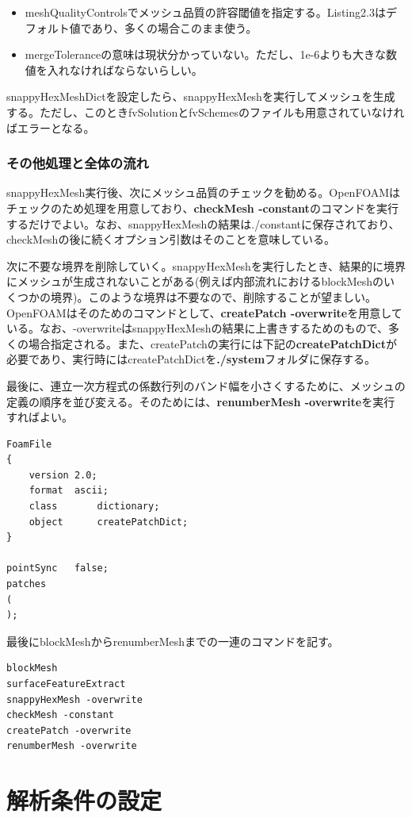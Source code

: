 \documentclass[dvipdfmx, 9pt, a4paper]{jsarticle}
\numberwithin{equation}{section}
\begin{document}
\begin{itemize}
\begin{itemize}
\item minThicknessで下限サイズを指定する。
\item layersのディクショナリでレイヤーメッシュを作成する境界面を指定する。本例のように境界名とレイヤー数(nSurfaceLayers)を指定する。なお、境界はジオメトリの名前と境界面の名前で名づける。Listing2.3はジオメトリgeo(つまりgeo.stl)に含まれる境界名side(solid sideで定義されている面)の例であり、\"geo\_side\"のようにアンダーバーでつなげる。
\end{itemize}
\item meshQualityControlsでメッシュ品質の許容閾値を指定する。Listing2.3はデフォルト値であり、多くの場合このまま使う。
\item mergeToleranceの意味は現状分かっていない。ただし、1e-6よりも大きな数値を入れなければならないらしい。
\end{itemize}\par
snappyHexMeshDictを設定したら、snappyHexMeshを実行してメッシュを生成する。ただし、このときfvSolutionとfvSchemesのファイルも用意されていなければエラーとなる。

\subsubsection{その他処理と全体の流れ}
snappyHexMesh実行後、次にメッシュ品質のチェックを勧める。OpenFOAMはチェックのため処理を用意しており、{\bf checkMesh -constant}のコマンドを実行するだけでよい。なお、snappyHexMeshの結果は./constantに保存されており、checkMeshの後に続くオプション引数はそのことを意味している。\par
次に不要な境界を削除していく。snappyHexMeshを実行したとき、結果的に境界にメッシュが生成されないことがある(例えば内部流れにおけるblockMeshのいくつかの境界)。このような境界は不要なので、削除することが望ましい。OpenFOAMはそのためのコマンドとして、{\bf createPatch -overwrite}を用意している。なお、-overwriteはsnappyHexMeshの結果に上書きするためのもので、多くの場合指定される。また、createPatchの実行には下記の{\bf createPatchDict}が必要であり、実行時にはcreatePatchDictを{\bf ./system}フォルダに保存する。\par
最後に、連立一次方程式の係数行列のバンド幅を小さくするために、メッシュの定義の順序を並び変える。そのためには、{\bf renumberMesh -overwrite}を実行すればよい。
\begin{lstlisting}[caption=createPatchDictの基本フォーマット]
FoamFile
{
	version	2.0;
	format	ascii;
	class		dictionary;
	object		createPatchDict;
}

pointSync	false;
patches
(
);
\end{lstlisting}\par
最後にblockMeshからrenumberMeshまでの一連のコマンドを記す。
\begin{lstlisting}[caption=メッシュ作成手順]
blockMesh
surfaceFeatureExtract
snappyHexMesh -overwrite
checkMesh -constant
createPatch -overwrite
renumberMesh -overwrite
\end{lstlisting}\par

\section{解析条件の設定}
\end{document}
